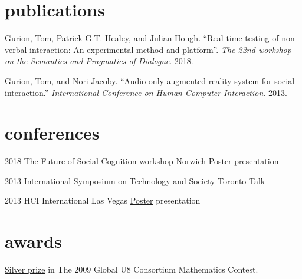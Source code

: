 \documentclass[]{friggeri-cv}
\begin{document}

\section{publications}

Gurion, Tom, Patrick G.T. Healey, and Julian Hough. ``Real-time testing of non-verbal interaction: An experimental method and platform''. \emph{The 22nd workshop on the Semantics and Pragmatics of Dialogue}. 2018.

Gurion, Tom, and Nori Jacoby. ``Audio-only augmented reality system for social interaction.'' \emph{International Conference on Human-Computer Interaction}. 2013.



\section{conferences}

\begin{entrylist}

    \entry
    {2018}
    {The Future of Social Cognition workshop}
    {Norwich}
    {\href{http://www.tomgurion.me/pdfs/FoSC2018 poster.pdf}{Poster} presentation}

\end{entrylist}
\begin{entrylist}

    \entry
    {2013}
    {International Symposium on Technology and Society}
    {Toronto}
    {\href{http://www.slideshare.net/Nagasaki45/audioonly-augmented-reality-system-for-social-interaction}{Talk}}

\end{entrylist}
\begin{entrylist}

    \entry
    {2013}
    {HCI International}
    {Las Vegas}
    {\href{http://www.tomgurion.me/pdfs/HCI2013 poster.pdf}{Poster} presentation}

\end{entrylist}



\section{awards}

\href{http://www.tomgurion.me/pdfs/U8 mathematic contest - silver prize.pdf}{Silver prize} in The 2009 Global U8 Consortium Mathematics Contest.
\end{document}
